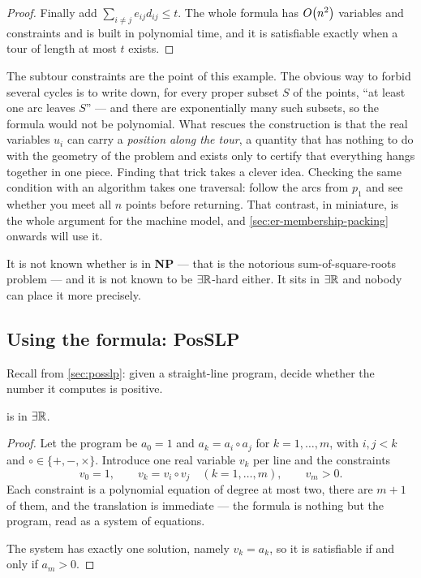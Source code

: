 \begin{proof}
Finally add $\sum_{i \ne j} e_{ij} d_{ij} \le t$. The whole formula has
$O\!\left(n^2\right)$ variables and constraints and is built in polynomial time, and it
is satisfiable exactly when a tour of length at most $t$ exists.
\end{proof}

\begin{intuition}
The subtour constraints are the point of this example. The obvious way to
forbid several cycles is to write down, for every proper subset $S$ of the
points, ``at least one arc leaves $S$'' --- and there are exponentially many
such subsets, so the formula would not be polynomial. What rescues the
construction is that the real variables $u_i$ can carry a \emph{position along
the tour}, a quantity that has nothing to do with the geometry of the problem
and exists only to certify that everything hangs together in one piece. Finding
that trick takes a clever idea. Checking the same condition with an algorithm
takes one traversal: follow the arcs from $p_1$ and see whether you meet all
$n$ points before returning. That contrast, in miniature, is the whole argument
for the machine model, and \cref{sec:er-membership-packing} onwards will use it.
\end{intuition}

\begin{remark}
It is not known whether  is in \textbf{NP} --- that is the
notorious sum-of-square-roots problem --- and it is not known to be
$\exists\mathbb{R}$-hard either. It sits in $\exists\mathbb{R}$ and nobody can place it more precisely.
\end{remark}

\subsection{Using the formula: PosSLP}
\label{sec:er-membership-posslp}

Recall  from \cref{sec:posslp}: given a straight-line program,
decide whether the number it computes is positive.

\begin{proposition}\label{prop:er-posslp}
 is in $\exists\mathbb{R}$.
\end{proposition}

\begin{proof}
Let the program be $a_0 = 1$ and $a_k = a_i \circ a_j$ for $k = 1, \ldots, m$,
with $i,j < k$ and $\circ \in \{+,-,\times\}$. Introduce one real variable
$v_k$ per line and the constraints
\[ v_0 = 1, \qquad v_k = v_i \circ v_j \quad (k = 1, \ldots, m), \qquad
   v_m > 0. \]
Each constraint is a polynomial equation of degree at most two, there are
$m+1$ of them, and the translation is immediate --- the formula is nothing but
the program, read as a system of equations.

The system has exactly one solution, namely $v_k = a_k$, so it is satisfiable if
and only if $a_m > 0$.
\end{proof}

